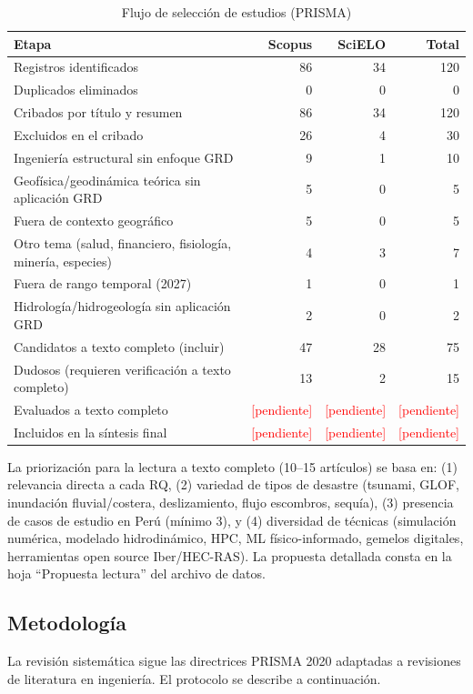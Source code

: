 \documentclass[12pt,a4paper]{article}
\newcommand{\relleno}[1]{\textcolor{red}{[#1]}}
\begin{document}
\begin{table}[ht]
  \centering
  \caption{Flujo de selección de estudios (PRISMA)}
  \label{tab:flujo}
  \begin{tabular}{@{}lrrr@{}}
    \toprule
    Etapa & Scopus & SciELO & Total \\
    \midrule
    Registros identificados & 86 & 34 & 120 \\
    Duplicados eliminados & 0 & 0 & 0 \\
    Cribados por título y resumen & 86 & 34 & 120 \\
    Excluidos en el cribado & 26 & 4 & 30 \\
    \quad\quad Ingeniería estructural sin enfoque GRD & 9 & 1 & 10 \\
    \quad\quad Geofísica/geodinámica teórica sin aplicación GRD & 5 & 0 & 5 \\
    \quad\quad Fuera de contexto geográfico & 5 & 0 & 5 \\
    \quad\quad Otro tema (salud, financiero, fisiología, minería, especies) & 4 & 3 & 7 \\
    \quad\quad Fuera de rango temporal (2027) & 1 & 0 & 1 \\
    \quad\quad Hidrología/hidrogeología sin aplicación GRD & 2 & 0 & 2 \\
    Candidatos a texto completo (incluir) & 47 & 28 & 75 \\
    Dudosos (requieren verificación a texto completo) & 13 & 2 & 15 \\
    Evaluados a texto completo & \relleno{pendiente} & \relleno{pendiente} & \relleno{pendiente} \\
    Incluidos en la síntesis final & \relleno{pendiente} & \relleno{pendiente} & \relleno{pendiente} \\
    \bottomrule
  \end{tabular}
\end{table}

La priorización para la lectura a texto completo (10--15 artículos) se basa en: (1) relevancia directa a cada RQ, (2) variedad de tipos de desastre (tsunami, GLOF, inundación fluvial/costera, deslizamiento, flujo escombros, sequía), (3) presencia de casos de estudio en Perú (mínimo 3), y (4) diversidad de técnicas (simulación numérica, modelado hidrodinámico, HPC, ML físico-informado, gemelos digitales, herramientas open source Iber/HEC-RAS). La propuesta detallada consta en la hoja ``Propuesta lectura'' del archivo de datos.

\subsection{Metodología}
La revisión sistemática sigue las directrices PRISMA 2020 adaptadas a revisiones de literatura en ingeniería. El protocolo se describe a continuación.
\end{document}
